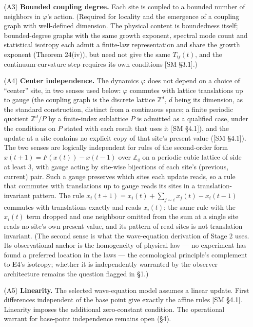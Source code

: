 \documentclass[
]{article}
\begin{document}
(A3) \textbf{Bounded coupling degree.} Each site is coupled to a bounded
number of neighbors in \(\varphi\)'s action. (Required for locality and
the emergence of a coupling graph with well-defined dimension. The
physical content is boundedness itself; bounded-degree graphs with the
same growth exponent, spectral mode count and statistical isotropy each
admit a finite-law representation and share the growth exponent (Theorem
24(iv)), but need not give the same \(T_{ij}(t)\), and the
continuum-curvature step requires its own conditions {[}SM §3.1{]}.)

(A4) \textbf{Center independence.} The dynamics \(\varphi\) does not
depend on a choice of ``center'' site, in two senses used below:
\(\varphi\) commutes with lattice translations up to gauge (the coupling
graph is the discrete lattice \(\mathbb{Z}^d\), \(d\) being its
dimension, as the standard construction, distinct from a continuous
space; a finite periodic quotient \(\mathbb{Z}^d/P\) by a finite-index
sublattice \(P\) is admitted as a qualified case, under the conditions
on \(P\) stated with each result that uses it {[}SM §4.1{]}), and the
update at a site contains no explicit copy of that site's present value
({[}SM §4.1{]}). The two senses are logically independent for rules of
the second-order form \(x(t+1) = F(x(t)) - x(t-1)\) over
\(\mathbb{Z}_q\) on a periodic cubic lattice of side at least \(3\),
with gauge acting by site-wise bijections of each site's (previous,
current) pair. Such a gauge preserves which sites each update reads, so
a rule that commutes with translations up to gauge reads its sites in a
translation-invariant pattern. The rule
\(x_i(t+1) = x_i(t) + \sum_{j\sim i} x_j(t) - x_i(t-1)\) commutes with
translations exactly and reads \(x_i(t)\); the same rule with the
\(x_i(t)\) term dropped and one neighbour omitted from the sum at a
single site reads no site's own present value, and its pattern of read
sites is not translation-invariant. (The second sense is what the
wave-equation derivation of Stage 2 uses. Its observational anchor is
the homogeneity of physical law --- no experiment has found a preferred
location in the laws --- the cosmological principle's complement to E4's
isotropy; whether it is independently warranted by the observer
architecture remains the question flagged in §1.)

(A5) \textbf{Linearity.} The selected wave-equation model assumes a
linear update. First differences independent of the base point give
exactly the affine rules {[}SM §4.1{]}. Linearity imposes the additional
zero-constant condition. The operational warrant for base-point
independence remains open (§4).
\end{document}
